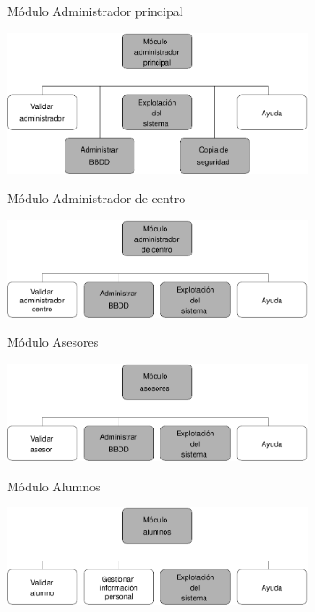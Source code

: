 \documentclass[10pt, hyperref={pdfpagelabels=false}]{beamer}
\begin{document}
      \begin{frame}{Módulo Administrador principal}
        \begin{center}
          \includegraphics[width=9cm]{Diagramas/moduloAdminPrincipal}
        \end{center}
      \end{frame}

      \begin{frame}{Módulo Administrador de centro}
        \begin{center}
          \includegraphics[width=9cm]{Diagramas/moduloAdminCentro}
        \end{center}
      \end{frame}

      \begin{frame}{Módulo Asesores}
        \begin{center}
          \includegraphics[width=9cm]{Diagramas/moduloAsesores}
        \end{center}
      \end{frame}

      \begin{frame}{Módulo Alumnos}
        \begin{center}
          \includegraphics[width=9cm]{Diagramas/moduloAlumnos}
        \end{center}
      \end{frame}
\end{document}

